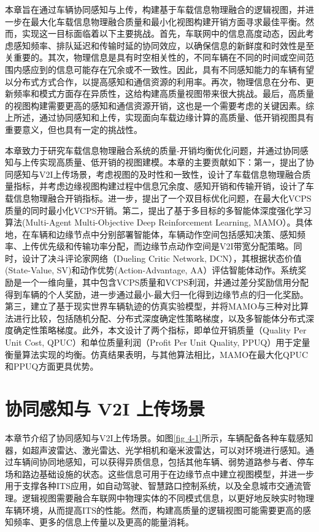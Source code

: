 本章旨在通过车辆协同感知与上传，构建基于车载信息物理融合的逻辑视图，并进一步在最大化车载信息物理融合质量和最小化视图构建开销方面寻求最佳平衡。然而，实现这一目标面临着以下主要挑战。首先，车联网中的信息高度动态，因此考虑感知频率、排队延迟和传输时延的协同效应，以确保信息的新鲜度和时效性是至关重要的。其次，物理信息是具有时空相关性的，不同车辆在不同的时间或空间范围内感应到的信息可能存在冗余或不一致性。因此，具有不同感知能力的车辆有望以分布式方式合作，以提高感知和通信资源的利用率。再次，物理信息在分布、更新频率和模式方面存在异质性，这给构建高质量视图带来很大挑战。最后，高质量的视图构建需要更高的感知和通信资源开销，这也是一个需要考虑的关键因素。综上所述，通过协同感知和上传，实现面向车载边缘计算的高质量、低开销视图具有重要意义，但也具有一定的挑战性。

本章致力于研究车载信息物理融合系统的质量-开销均衡优化问题，并通过协同感知与上传实现高质量、低开销的视图建模。本章的主要贡献如下：第一，提出了协同感知与V2I上传场景，考虑视图的及时性和一致性，设计了车载信息物理融合质量指标，并考虑边缘视图构建过程中信息冗余度、感知开销和传输开销，设计了车载信息物理融合开销指标。进一步，提出了一个双目标优化问题，在最大化VCPS质量的同时最小化VCPS开销。第二，提出了基于多目标的多智能体深度强化学习算法(Multi-Agent Multi-Objective Deep Reinforcement Learning, MAMO）。具体地，在车辆和边缘节点中分别部署智能体，车辆动作空间包括感知决策、感知频率、上传优先级和传输功率分配，而边缘节点动作空间是V2I带宽分配策略。同时，设计了决斗评论家网络（Dueling Critic Network, DCN），其根据状态价值(State-Value, SV)和动作优势(Action-Advantage, AA）评估智能体动作。系统奖励是一个一维向量，其中包含VCPS质量和VCPS利润，并通过差分奖励信用分配得到车辆的个人奖励，进一步通过最小-最大归一化得到边缘节点的归一化奖励。第三，建立了基于现实世界车辆轨迹的仿真实验模型，并将MAMO与三种对比算法进行比较，包括随机分配、分布式深度确定性策略梯度\cite{barth2018distributed}，以及多智能体分布式深度确定性策略梯度。此外，本文设计了两个指标，即单位开销质量（Quality Per Unit Cost, QPUC）和单位质量利润（Proﬁt Per Unit Quality, PPUQ）用于定量衡量算法实现的均衡。仿真结果表明，与其他算法相比，MAMO在最大化QPUC和PPUQ方面更具优势。

\section{协同感知与 V2I 上传场景}\label{section 4-2}

本章节介绍了协同感知与V2I上传场景。如图\ref{fig 4-1}所示，车辆配备各种车载感知器，如超声波雷达、激光雷达、光学相机和毫米波雷达，可以对环境进行感知。通过车辆间协同地感知，可以获得异质信息，包括其他车辆、弱势道路参与者、停车场和路边基础设施的状态。这些信息可用于在边缘节点中建立视图模型，并进一步用于支撑各种ITS应用，如自动驾驶\cite{bai2022hybrid}、智慧路口控制系统\cite{hadjigeorgious2023real}，以及全息城市交通流管理\cite{wang2023city}。逻辑视图需要融合车联网中物理实体的不同模式信息，以更好地反映实时物理车辆环境，从而提高ITS的性能。然而，构建高质量的逻辑视图可能需要更高的感知频率、更多的信息上传量以及更高的能量消耗。

